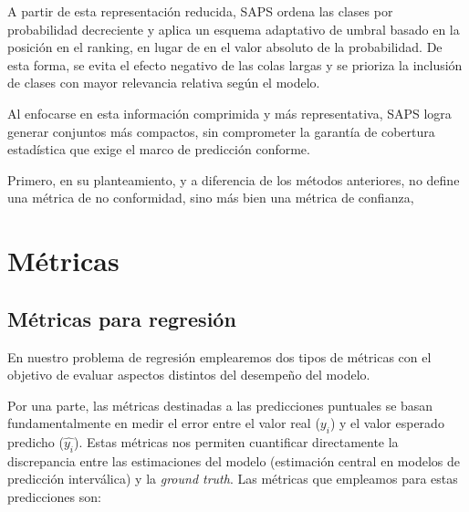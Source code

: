 A partir de esta representación reducida, SAPS ordena las clases por probabilidad decreciente y aplica un esquema adaptativo de umbral basado en la posición en el ranking, en lugar de en el valor absoluto de la probabilidad. De esta forma, se evita el efecto negativo de las colas largas y se prioriza la inclusión de clases con mayor relevancia relativa según el modelo.





Al enfocarse en esta información comprimida y más representativa, SAPS logra generar conjuntos más compactos, sin comprometer la garantía de cobertura estadística que exige el marco de predicción conforme.





Primero, en su planteamiento, y a diferencia de los métodos anteriores, no define una métrica de no conformidad, sino más bien una métrica de confianza, 




\section{Métricas}


\subsection{Métricas para regresión}

En nuestro problema de regresión emplearemos dos tipos de métricas con el objetivo de evaluar aspectos distintos del desempeño del modelo.

Por una parte, las métricas destinadas a las predicciones puntuales se basan fundamentalmente en medir el error entre el valor real ($y_i$) y el valor esperado predicho ($\hat{y_i}$). Estas métricas nos permiten cuantificar directamente la discrepancia entre las estimaciones del modelo (estimación central en modelos de predicción interválica) y la \textit{ground truth}. Las métricas que empleamos para estas predicciones son:

